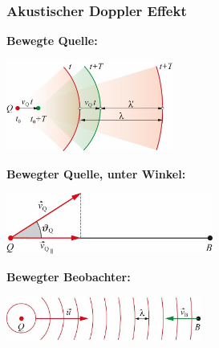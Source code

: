 \subsubsection{Akustischer Doppler Effekt}
\begin{center}
	\begin{minipage}{0.3\textwidth}
		\textbf{Bewegte Quelle:}\\
	\end{minipage}%
	\begin{minipage}{0.2\textwidth}
		\includegraphics[height=3cm,keepaspectratio=true]{Images/akustischer_doppler_effekt_bewegte_quelle.png}
	\end{minipage}
\end{center}
\begin{center}
	\begin{minipage}{0.2\textwidth}
		\textbf{Bewegter Quelle, unter Winkel:}\\
	\end{minipage}%
	\begin{minipage}{0.3\textwidth}
		\includegraphics[height=2cm,right,keepaspectratio=true]{Images/akustischer_doppler_effekt_bewegte_quelle_unter_winkel.png}
	\end{minipage}
\end{center}
\begin{center}
	\begin{minipage}{0.2\textwidth}
		\textbf{Bewegter Beobachter:}\\
	\end{minipage}%
	\begin{minipage}{0.3\textwidth}
		\includegraphics[height=1.5cm,right,keepaspectratio=true]{Images/akustischer_doppler_effekt_bewegter_beobachter.png}
	\end{minipage}
\end{center}
